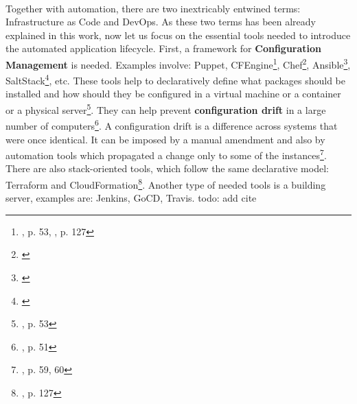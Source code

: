 \paragraph{}
Together with automation, there are two inextricably entwined terms: Infrastructure as Code and DevOps. As these two terms has been already explained in this work, now let us focus on the essential tools needed to introduce the automated application lifecycle. First, a framework for \textbf{Configuration Management} is needed. Examples involve: Puppet, CFEngine\footnote{\cite{book-cicd}, p. 53, \cite{book-iac}, p. 127}, Chef\footnote{\cite{online-chef}}, Ansible\footnote{\cite{online-ansible}}, SaltStack\footnote{\cite{online-salt}}, etc. These tools help to declaratively define what packages should be installed and how should they be configured in a virtual machine or a container or a physical server\footnote{\cite{book-cicd}, p. 53}. They can help prevent \textbf{configuration drift} in a large number of computers\footnote{\cite{book-devops-k8s}, p. 51}. A configuration drift is a difference across systems that were once identical. It can be imposed by a manual amendment and also by automation tools which propagated a change only to some of the instances\footnote{\cite{book-iac}, p. 59, 60}. There are also stack-oriented tools, which follow the same declarative model: Terraform and CloudFormation\footnote{\cite{book-iac}, p. 127}. Another type of needed tools is a building server, examples are: Jenkins, GoCD, Travis. todo: add cite

